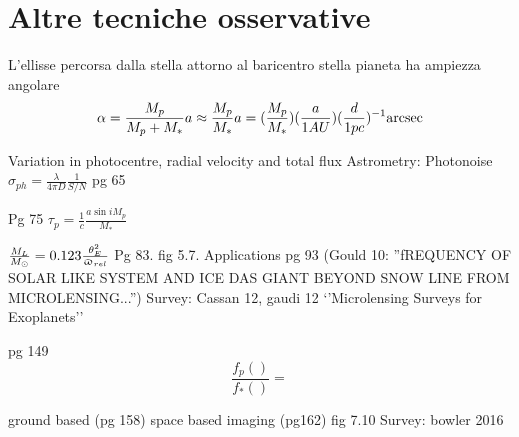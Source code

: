 \section{Altre tecniche osservative}
\begin{workout}[Astrometry]
L'ellisse percorsa dalla stella attorno al baricentro stella pianeta ha ampiezza angolare
\begin{equation}
\alpha=\frac{M_p}{M_p+M_*}a\approx\frac{M_p}{M_*}a=(\frac{M_p}{M_*})(\frac{a}{1AU})(\frac{d}{1pc})\expy{-1}\si{\arcsec}
\end{equation}

Variation in photocentre, radial velocity and total flux
Astrometry: Photonoise $\sigma_{ph}=\frac{\lambda}{4\pi D}\frac{1}{S/N}$
pg 65

\end{workout}

\begin{workout}
Pg 75
$\tau_p=\frac{1}{c}\frac{a\sin{i}M_p}{M_*}$
\end{workout}

\begin{workout}[Microlensing]
$\frac{M_L}{\msun{}}=0.123\frac{\theta_E^2}{\upvarpi_{rel}}$
Pg 83. fig 5.7. Applications pg 93
(Gould 10: ''fREQUENCY OF SOLAR LIKE SYSTEM AND ICE DAS GIANT BEYOND SNOW LINE FROM MICROLENSING...'')
Survey: Cassan 12, gaudi 12 `'Microlensing Surveys for Exoplanets''
\end{workout}



\begin{workout}
pg 149
\begin{equation*}
\frac{f_p()}{f_*()}=
\end{equation*}
\end{workout}
\begin{workout}
ground based (pg 158) space based imaging (pg162)
fig 7.10
Survey: bowler 2016
\end{workout}